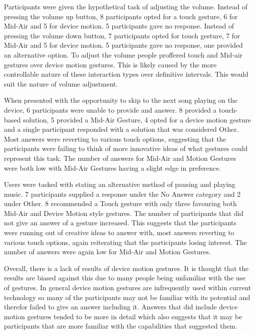 \documentclass{l4proj}
\begin{document}
Participants were given the hypothetical task of adjusting the volume. Instead of pressing the volume up button, 8 participants opted for a touch gesture, 6 for Mid-Air and 5 for device motion. 5 participants gave no response. Instead of pressing the volume down button, 7 participants opted for touch gesture, 7 for Mid-Air and 5 for device motion. 5 participants gave no response, one provided an alternative option. To adjust the volume people proffered touch and Mid-air gestures over device motion gestures. This is likely caused by the more controllable nature of these interaction types over definitive intervals. This would suit the nature of volume adjustment.

When presented with the opportunity to skip to the next song playing on the device, 6 participants were unable to provide and answer. 8 provided a touch-based solution, 5 provided a Mid-Air Gesture, 4 opted for a device motion gesture and a single participant responded with a solution that was considered Other. Most answers were reverting to various touch options, suggesting that the participants were failing to think of more innovative ideas of what gestures could represent this task. The number of answers for Mid-Air and Motion Gestures were both low with Mid-Air Gestures having a slight edge in preference.

Users were tasked with stating an alternative method of pausing and playing music. 7 participants supplied a response under the No Answer category and 2 under Other. 8 recommended a Touch gesture with only three favouring both Mid-Air and Device Motion style gestures. The number of participants that did not give an answer of a gesture increased. This suggests that the participants were running out of creative ideas to answer with, most answers reverting to various touch options, again reiterating that the participants losing interest. The number of answers were again low for Mid-Air and Motion Gestures.

Overall, there is a lack of results of device motion gestures. It is thought that the results are biased against this due to many people being unfamiliar with the use of gestures. In general device motion gestures are infrequently used within current technology so many of the participants may not be familiar with its potential and therefor failed to give an answer including it. Answers that did include device motion gestures tended to be more in detail which also suggests that it may be participants that are more familiar with the capabilities that suggested them.
\end{document}
